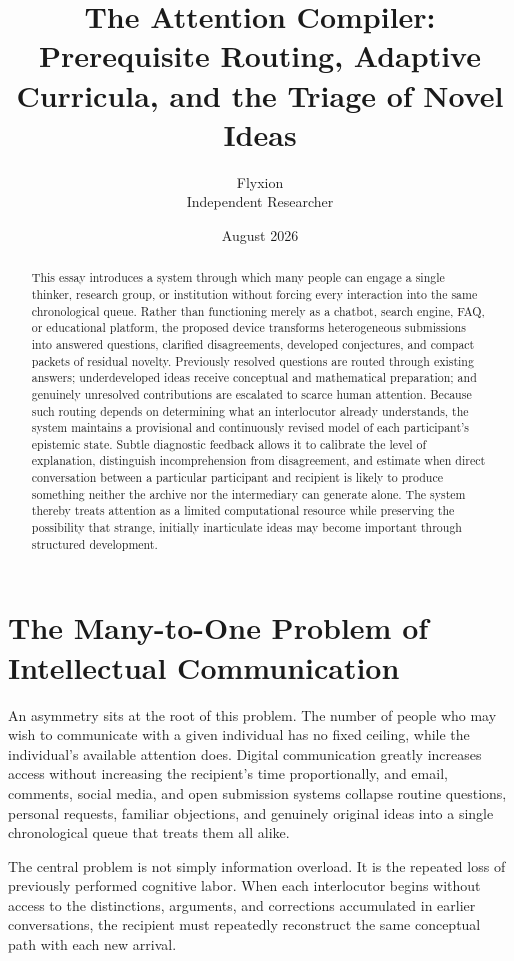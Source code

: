 \documentclass[11pt]{article}
\title{\textbf{The Attention Compiler: Prerequisite Routing, Adaptive Curricula, and the Triage of Novel Ideas}}
\author{Flyxion \\ \small Independent Researcher}
\date{August 2026}
\begin{document}
\maketitle

\begin{abstract}
This essay introduces a system through which many people can engage a single thinker, research group, or institution without forcing every interaction into the same chronological queue. Rather than functioning merely as a chatbot, search engine, FAQ, or educational platform, the proposed device transforms heterogeneous submissions into answered questions, clarified disagreements, developed conjectures, and compact packets of residual novelty. Previously resolved questions are routed through existing answers; underdeveloped ideas receive conceptual and mathematical preparation; and genuinely unresolved contributions are escalated to scarce human attention. Because such routing depends on determining what an interlocutor already understands, the system maintains a provisional and continuously revised model of each participant's epistemic state. Subtle diagnostic feedback allows it to calibrate the level of explanation, distinguish incomprehension from disagreement, and estimate when direct conversation between a particular participant and recipient is likely to produce something neither the archive nor the intermediary can generate alone. The system thereby treats attention as a limited computational resource while preserving the possibility that strange, initially inarticulate ideas may become important through structured development.
\end{abstract}

\section{The Many-to-One Problem of Intellectual Communication}

An asymmetry sits at the root of this problem. The number of people who may wish to communicate with a given individual has no fixed ceiling, while the individual's available attention does. Digital communication greatly increases access without increasing the recipient's time proportionally, and email, comments, social media, and open submission systems collapse routine questions, personal requests, familiar objections, and genuinely original ideas into a single chronological queue that treats them all alike.

The central problem is not simply information overload. It is the repeated loss of previously performed cognitive labor. When each interlocutor begins without access to the distinctions, arguments, and corrections accumulated in earlier conversations, the recipient must repeatedly reconstruct the same conceptual path with each new arrival.
\end{document}
